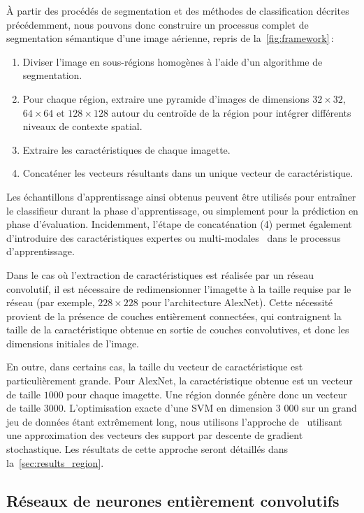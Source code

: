 À partir des procédés de segmentation et des méthodes de classification décrites précédemment, nous pouvons donc construire un processus complet de segmentation sémantique d'une image aérienne, repris de la~\cref{fig:framework}\,:
\begin{enumerate}
    \item Diviser l'image en sous-régions homogènes à l'aide d'un algorithme de segmentation.
    \item Pour chaque région, extraire une pyramide d'images de dimensions $32\times32$, $64\times64$ et $128\times128$ autour du centroïde de la région pour intégrer différents niveaux de contexte spatial.
    \item Extraire les caractéristiques de chaque imagette.
    \item Concaténer les vecteurs résultants dans un unique vecteur de caractéristique.
\end{enumerate}

Les échantillons d'apprentissage ainsi obtenus peuvent être utilisés pour entraîner le classifieur durant la phase d'apprentissage, ou simplement pour la prédiction en phase d'évaluation. Incidemment, l'étape de concaténation (4) permet également d'introduire des caractéristiques expertes ou multi-modales~\cite{lagrange_benchmarking_2015} dans le processus d'apprentissage.

Dans le cas où l'extraction de caractéristiques est réalisée par un réseau convolutif, il est nécessaire de redimensionner l'imagette à la taille requise par le réseau (par exemple, $228\times228$ pour l'architecture AlexNet). Cette nécessité provient de la présence de couches entièrement connectées, qui contraignent la taille de la caractéristique obtenue en sortie de couches convolutives, et donc les dimensions initiales de l'image.

En outre, dans certains cas, la taille du vecteur de caractéristique est particulièrement grande. Pour AlexNet, la caractéristique obtenue est un vecteur de taille $1 000$ pour chaque imagette. Une région donnée génère donc un vecteur de taille $3 000$. L'optimisation exacte d'une \gls{SVM} en dimension 3 000 sur un grand jeu de données étant extrêmement long, nous utilisons l'approche de~\citet{bottou_large-scale_2010} utilisant une approximation des vecteurs des support par descente de gradient stochastique. Les résultats de cette approche seront détaillés dans la~\cref{sec:results_region}.

\subsection{Réseaux de neurones entièrement convolutifs}

